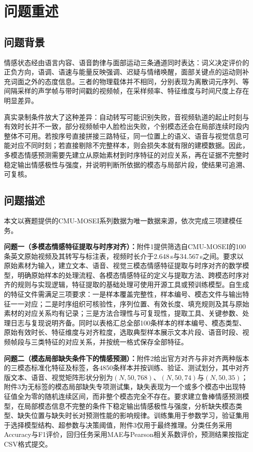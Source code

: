 \section{问题重述}
\subsection{问题背景}
情感状态经由语言内容、语音韵律与面部运动三条通道同时表达：词义决定评价的正负方向，语调、语速与能量反映强调、迟疑与情绪唤醒，面部关键点的运动则补充词面之外的态度信息。三者的物理载体并不相同，分别表现为离散词元序列、等间隔采样的声学帧与带时间戳的视频帧，在采样频率、特征维度与时间尺度上存在明显差异。

真实录制条件放大了这种差异：自动转写可能识别失败，音视频轨道的起止时刻与有效时长并不一致，部分视频帧中人脸检出失败，个别模态还会在局部连续时段内整体不可用。若按序号直接拼接三路特征，同一位置上的语义、语音与视觉信息可能对应不同时刻；若直接剔除不完整样本，则会损失本就有限的建模数据。因此，多模态情感预测需要先建立从原始素材到时序特征的对应关系，再在证据不完整时稳定输出情感极性与强度，并说明判断所依据的模态与局部片段，使结果可追溯、可复核。

\subsection{问题描述}
本文以赛题提供的CMU-MOSEI系列数据为唯一数据来源，依次完成三项建模任务。

\textbf{问题一（多模态情感特征提取与时序对齐）：}附件1提供筛选自CMU-MOSEI的100条英文原始视频及其转写与标注表，视频时长介于2.648\,s与34.567\,s之间。要求以原始素材为输入，建立文本、语音、视觉三模态情感特征提取与时序对齐的数学模型，明确原始样本的处理流程、各模态情感特征的定义与提取方法、跨模态时序对齐的规则与实现逻辑，特征提取的基础处理可使用开源工具或预训练模型。自生成的特征文件需满足三项要求：一是样本覆盖完整性，样本编号、模态文件与输出特征一一对应；二是时序组织可核验性，序列位置、有效长度、填充规则及其与原始素材的对应关系均有记录；三是方法合理性与可复现性，提取工具、关键参数、处理日志与复现说明齐备。同时以表格汇总全部100条样本的样本编号、模态类型、原始有效时长、特征维度与对齐粒度，选取典型样本展示文本片段、语音时段、视频帧段与三类特征的对应关系，并按统一格式保存全部特征。

\textbf{问题二（模态局部缺失条件下的情感预测）：}附件2给出官方对齐与非对齐两种版本的三模态标准化特征及标签，各4850条样本并按训练、验证、测试划分，其中对齐版文本、语音、视觉矩阵形状分别为$(N,50,768)$、$(N,50,74)$与$(N,50,35)$；附件3为无标签的模态局部缺失专项测试集，缺失表现为一个或多个模态中出现特征值全为零的随机连续区间，而非整个模态完全不存在。要求建立鲁棒情感预测模型，在局部模态信息不完整的条件下稳定输出情感极性与强度，分析缺失模态类型、缺失位置与缺失时长对预测性能的影响规律。训练集用于参数学习，验证集用于选择模型结构、超参数与决策阈值，附件3仅用于最终推理。分类任务采用Accuracy与F1评价，回归任务采用MAE与Pearson相关系数评价，预测结果按指定CSV格式提交。

